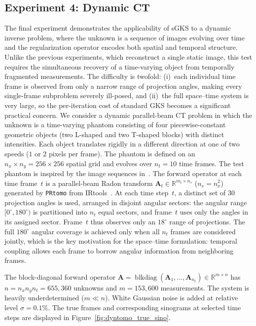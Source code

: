 \documentclass[%
  a4paper,
  onecolumn,
  colorlinks,
]{preprint}
\theoremstyle{plain}
\theoremstyle{definition}
\newcommand{\R}{\ensuremath{\mathbb{R}}}
\newcommand{\bA}{\ensuremath{\boldsymbol{A}}}
\begin{document}
\subsection{Experiment 4: Dynamic CT}\label{sec:dynamic_CT}
The final experiment demonstrates the applicability of sGKS to a
dynamic inverse problem, where the unknown is a sequence of images
evolving over time and the regularization operator encodes both spatial
and temporal structure.
Unlike the previous experiments, which reconstruct a single static
image, this test requires the simultaneous recovery of a time-varying
object from temporally fragmented measurements.
The difficulty is twofold: (i)~each individual time frame is observed
from only a narrow range of projection angles, making every
single-frame subproblem severely ill-posed, and (ii)~the full
space--time system is very large, so the per-iteration cost of standard
GKS becomes a significant practical concern.
We consider a dynamic parallel-beam CT problem in which the unknown is
a time-varying phantom consisting of four piecewise-constant geometric
objects (two L-shaped and two T-shaped blocks) with distinct
intensities.
Each object translates rigidly in a different direction at one of two
speeds ($1$ or $2$ pixels per frame).
The phantom is defined on an $n_x \times n_y = 256 \times 256$ spatial
grid and evolves over $n_t = 10$ time frames.
The test phantom is inspired by the image sequences
in~\cite{okunola2025efficient}.
The forward operator at each time frame~$t$ is a parallel-beam Radon
transform $\bA_t \in \R^{m_t \times n_s}$ ($n_s = n_x^2$) generated
by \texttt{PRtomo} from IRtools~\cite{GazzolaNagyPer19}.
At each time step~$t$, a distinct set of $30$ projection angles is
used, arranged in disjoint angular sectors: the angular range
$[0^\circ, 180^\circ)$ is partitioned into $n_t$ equal sectors, and
frame~$t$ uses only the angles in its assigned sector.
Frame~$t$ thus observes only an $18^\circ$ range of projections.
The full $180^\circ$ angular coverage is achieved only when all
$n_t$ frames are considered jointly, which is the key motivation for
the space--time formulation: temporal coupling allows each frame to
borrow angular information from neighboring frames.

The block-diagonal forward operator
$\bA = \operatorname{blkdiag}(\bA_1, \ldots, \bA_{n_t})
\in \R^{m \times n}$
has $n = n_x n_y n_t = 655{,}360$ unknowns and
$m = 153{,}600$ measurements.
The system is heavily underdetermined ($m \ll n$).
White Gaussian noise is added at relative level $\sigma = 0.1\%$.
The true frames and corresponding sinograms at selected time steps are
displayed in Figure~\ref{fig:dyntomo_true_sino}.
\end{document}
